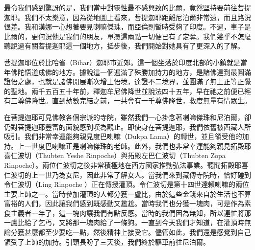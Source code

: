 最令我們感到驚訝的是，我們當中對靈性最不感興致的比爾，竟然堅持要前往菩提迦耶。我們不太樂意，因為從地圖上看來，菩提迦耶距離尼泊爾非常遠，而且路況很差。我和漢娜一心想著要見喇嘛傑珠，而亞倫則暫時受夠了印度。不過，車子是比爾的，更何況他是我們的朋友，單憑這兩點一切便已有了定奪。我們幾乎不怎麼聽說過有關菩提迦耶這一個地方，抵步後，我們開始對她具有了更深入的了解。

菩提迦耶位於比哈省（Bihar）迦耶市近郊。這一個坐落於印度北部的小鎮就是當年佛陀悟道成佛的地方。據說這一個遍滿了殊勝加持力的地方，是諸佛達到最圓滿證悟之處，也就是諸佛開展漸次增上悟境，達證不二境界，並圓滿了無上正等正覺的聖地。兩千五百五十年前，釋迦牟尼佛降世並說法四十五年，早在祂之前便已經有三尊佛降世。直到劫數完結之前，一共會有一千尊佛降世，救度無量有情眾生。

在菩提迦耶可見佛教各個宗派的寺院，雖然我們一心掛念著喇嘛傑珠和尼泊爾，卻仍對菩提迦耶豐富的面貌感到嘆為觀止。即使身在菩提迦耶，我們依舊被西藏人所吸引。我們非常幸運能夠親見度巴喇嘛（Dukpa
Lama）的轉世，並且領受他的加持。上一世度巴喇嘛正是喇嘛傑珠的老師。此外，我們也非常幸運能夠親見拓殿耶喜仁波切（Thubten
Yeshe Rinpoche）與拓殿左巴仁波切（Thubten Zopa
Rinpoche）。兩位仁波切之後非常積極地在西方國家推動弘法事業。聽聞拓殿耶喜仁波切的上一世乃為女尼，因此非常了解女人。當我們來到藏傳寺院時，恰好碰到令仁波切（Ling
Rinpoche
）正在傳授灌頂。令仁波切是第十四世達賴喇嘛的兩位主要上師之一。當時參加灌頂的人都分獲一盧比，由於這些金錢來自於生活也不算富裕的人們，因此讓我們感到既感動又尷尬。當時我們也分獲一塊肉，可是作為素食主義者一年了，這一塊肉讓我們有點反感。當時的我們因為無知，所以連忙將那一盧比給了乞丐，又將那一塊肉給了一條狗。一直到今天我們才知道，在灌頂時無論分獲甚麼都至少要吃一點，然後精神上接受它。儘管如此，我們還是感覺到自己領受了上師的加持。引頸長盼了三天後，我們終於驅車前往尼泊爾。

